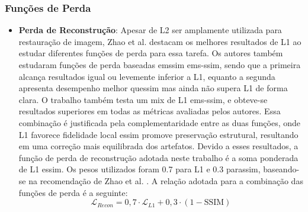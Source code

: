 \subsubsection{Funções de Perda}
\begin{itemize}
    \item \textbf{Perda de Reconstrução}: Apesar de L2 ser amplamente utilizada para restauração de imagem, Zhao et al. \cite{zhaoLossFunctionsImage2017} destacam os melhores resultados de L1 ao estudar diferentes funções de perda para essa tarefa. Os autores também estudaram funções de perda baseadas em\acrshort{ssim} e\acrshort{ms-ssim}, sendo que a primeira alcança resultados igual ou levemente inferior a L1, equanto a segunda apresenta desempenho melhor que\acrshort{ssim} mas ainda não supera L1 de forma clara. O trabalho também testa um mix de L1 e\acrshort{ms-ssim}, e obteve-se resultados superiores em todas as métricas avaliadas pelos autores. Essa combinação é justificada pela complementaridade entre as duas funções, onde L1 favorece fidelidade local e\acrshort{ssim} promove preservação estrutural, resultando em uma correção mais equilibrada dos artefatos. Devido a esses resultados, a função de perda de reconstrução adotada neste trabalho é a soma ponderada de L1 e\acrshort{ssim}. Os pesos utilizados foram 0.7 para L1 e 0.3 para\acrshort{ssim}, baseando-se na recomendação de Zhao et al. \cite{zhaoLossFunctionsImage2017}. A relação adotada para a combinação das funções de perda é a seguinte:
        \[
        \mathcal{L}_{Recon} = 0{,}7 \cdot \mathcal{L}_{L1} + 0{,}3 \cdot (1 - \text{SSIM})
        \]


\end{itemize}

